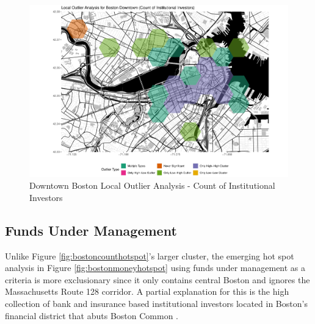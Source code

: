 \begin{figure}
	\centering
	\includegraphics[width=1\linewidth]{Figures/ChapterIV/Bos_Count_LO_Downtown}
	\caption[Downtown Boston Local Outlier Analysis - Count of Institutional Investors 1999-2018]{Downtown Boston Local Outlier Analysis - Count of Institutional Investors}
	\label{fig:bostoncountlocaloutliercount_Downtown}
\end{figure}


\subsection{Funds Under Management}

Unlike Figure \ref{fig:bostoncounthotspot}'s larger cluster, the emerging hot spot analysis in Figure \ref{fig:bostonmoneyhotspot} using funds under management as a criteria is more exclusionary since it only contains central Boston and ignores the Massachusetts Route 128 corridor.  A partial explanation for this is the high collection of bank and insurance based institutional investors located in Boston's financial district that abuts Boston Common .    	


